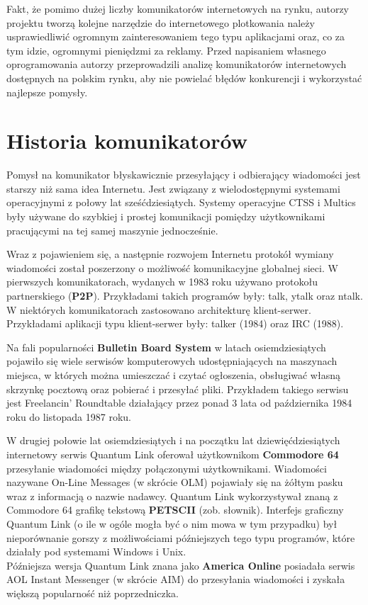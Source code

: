 \documentclass[a4paper,12pt]{article}
\begin{document}
\par Fakt, że pomimo dużej liczby komunikatorów internetowych na rynku, autorzy projektu tworzą kolejne narzędzie do internetowego plotkowania należy usprawiedliwić ogromnym zainteresowaniem tego typu aplikacjami oraz, co za tym idzie, ogromnymi pieniędzmi za reklamy. Przed napisaniem własnego oprogramowania autorzy przeprowadzili analizę komunikatorów internetowych dostępnych na polskim rynku, aby nie powielać błędów konkurencji i wykorzystać najlepsze pomysły.

\section[Historia komunikatorów]{Historia komunikatorów}
Pomysł na komunikator błyskawicznie przesyłający i odbierający wiadomości jest starszy niż sama idea Internetu. Jest związany z wielodostępnymi systemami operacyjnymi z połowy lat sześćdziesiątych. Systemy operacyjne CTSS i Multics były używane do szybkiej i prostej komunikacji pomiędzy użytkownikami pracującymi na tej samej maszynie jednocześnie.

\par Wraz z pojawieniem się, a następnie rozwojem Internetu protokół wymiany wiadomości został poszerzony o możliwość komunikacyjne globalnej sieci. W pierwszych komunikatorach, wydanych w 1983 roku używano protokołu
partnerskiego (\textbf{P2P}). Przykładami takich programów były: talk, ytalk oraz ntalk.
W niektórych komunikatorach zastosowano architekturę klient-serwer. Przykładami aplikacji typu klient-serwer były: talker (1984) oraz IRC (1988).

\newpage
Na fali popularności \textbf{Bulletin Board System} w latach osiemdziesiątych pojawiło się wiele serwisów komputerowych udostępniających na maszynach miejsca, w których można umieszczać i czytać ogłoszenia, obsługiwać własną skrzynkę pocztową oraz pobierać i przesyłać pliki.
Przykładem takiego serwisu jest Freelancin' Roundtable działający przez ponad 3 lata od października 1984 roku do listopada 1987 roku.

\par W drugiej połowie lat osiemdziesiątych i na początku lat dziewięćdziesiątych internetowy serwis Quantum Link oferował użytkownikom \textbf{Commodore 64} przesyłanie wiadomości między połączonymi użytkownikami. Wiadomości nazywane On-Line Messages (w skrócie OLM) pojawiały się na żółtym pasku wraz z informacją o nazwie nadawcy. Quantum Link wykorzystywał znaną z Commodore 64 grafikę tekstową \textbf{PETSCII} (zob. słownik). Interfejs graficzny Quantum Link  (o ile w ogóle mogła być o nim mowa w tym przypadku) był nieporównanie gorszy z możliwościami późniejszych tego typu programów, które działały pod systemami Windows i Unix.\\
Późniejsza wersja Quantum Link znana jako \textbf{America Online} posiadała serwis AOL Instant Messenger (w skrócie AIM) do przesyłania wiadomości i zyskała większą popularność niż poprzedniczka.
\end{document}
